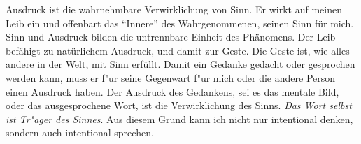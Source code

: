 \documentclass[a4paper, 12pt]{article}
\begin{document}
\begin{onehalfspace}
Ausdruck ist die wahrnehmbare Verwirklichung von Sinn. Er wirkt auf meinen Leib ein und offenbart das "`Innere"' des Wahrgenommenen, seinen Sinn für mich. Sinn und Ausdruck bilden die untrennbare Einheit des Phänomens. Der Leib befähigt zu natürlichem Ausdruck, und damit zur Geste. Die Geste ist, wie alles andere in der Welt, mit Sinn erfüllt. Damit ein Gedanke gedacht oder gesprochen werden kann, muss er f"ur seine Gegenwart f"ur mich oder die andere Person einen Ausdruck haben. Der Ausdruck des Gedankens, sei es das mentale Bild, oder das ausgesprochene Wort, ist die Verwirklichung des Sinns. \emph{Das Wort selbst ist Tr"ager des Sinnes}. Aus diesem Grund kann ich nicht nur intentional denken, sondern auch intentional sprechen.



\end{onehalfspace}
\nocite{*}
%
\printbibliography
\end{document}
